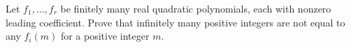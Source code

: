 Let $f_1,\ldots,f_r$ be finitely many real quadratic polynomials, each with nonzero leading coefficient. Prove that infinitely many positive integers are not equal to any $f_i(m)$ for a positive integer $m$.
